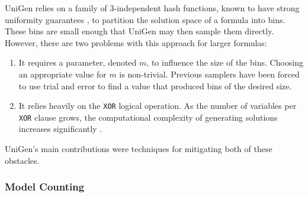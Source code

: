 UniGen relies on a family of 3-independent hash functions, known to have strong uniformity guarantees \cite{gomes_near-uniform_2007}, to partition the solution space of a formula into bins. These bins are small enough that UniGen may then sample them directly. However, there are two problems with this approach for larger formulas:

\begin{enumerate}
\item It requires a parameter, denoted $m$, to influence the size of the bins. Choosing an appropriate value for $m$ is non-trivial. Previous samplers have been forced to use trial and error to find a value that produced bins of the desired size.
\item It relies heavily on the \texttt{XOR} logical operation. As the number of variables per \texttt{XOR} clause grows, the computational complexity of generating solutions increases significantly \cite{Gomes:2007:SXM:1768142.1768155}.
  \end{enumerate}

UniGen's main contributions were techniques for mitigating both of these obstacles.



\subsubsection{Model Counting}

